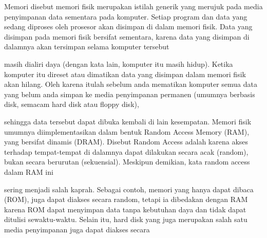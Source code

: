
Memori disebut memori fisik merupakan istilah generik yang merujuk pada media penyimpanan data sementara pada komputer. Setiap program dan data yang sedang diproses oleh prosesor akan disimpan di dalam memori fisik. Data yang disimpan pada memori fisik bersifat sementara, karena data yang disimpan di dalamnya akan tersimpan selama komputer tersebut

masih dialiri daya (dengan kata lain, komputer itu masih hidup). Ketika komputer itu direset atau dimatikan data yang disimpan dalam memori fisik akan hilang. Oleh karena itulah sebelum anda mematikan komputer semua data yang belum anda simpan ke media penyimpanan permanen (umumnya berbasis disk, semacam hard disk atau floppy disk),

sehingga data tersebut dapat dibuka kembali di lain kesempatan. Memori fisik umumnya diimplementasikan dalam bentuk Random Access Memory (RAM), yang bersifat dinamis (DRAM). Disebut Random Access adalah karena akses terhadap tempat-tempat di dalamnya dapat dilakukan secara acak (random), bukan secara berurutan (sekuensial). Meskipun demikian, kata random access dalam RAM ini

sering menjadi salah kaprah. Sebagai contoh, memori yang hanya dapat dibaca (ROM), juga dapat diakses secara random, tetapi ia dibedakan dengan RAM karena ROM dapat menyimpan data tanpa kebutuhan daya dan tidak dapat ditulisi sewaktu-waktu. Selain itu, hard disk yang juga merupakan salah satu media penyimpanan juga dapat diakses secara